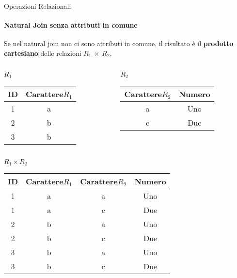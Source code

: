     \begin{frame}{Operazioni Relazionali}
        \framesubtitle{Natural Join senza attributi in comune}
        Se nel natural join non ci sono attributi in comune, il risultato \`e il \textbf{prodotto cartesiano} delle relazioni $R_1~\times~R_2$.
        \begin{columns}
            \begin{column}{0.48\textwidth}
                \centering
                {\small $R_1$}
                \newline
        \begin{tabular}{|c|c|}
            \hline
            \rowcolor{cyan!30}ID & Carattere$R_1$ \\
            \hline
            1 & a \\ \hline
            2 & b \\ \hline
            3 & b \\ \hline
            \end{tabular}
            \end{column}
            \begin{column}{0.48\textwidth}
                \centering
                {\small $R_2$}
                \newline
                \begin{tabular}{|c|c|}
                    \hline
                    \rowcolor{cyan!30} Carattere$R_2$ & Numero \\ \hline
                    a & Uno \\ \hline
                    c & Due \\ \hline
                    \end{tabular}
            \end{column}
        \end{columns}
        \vspace{.1cm}
        \centering
        \pause
        {\small $R_1 \times R_2$
        \begin{tabular}{|c|c|c|c|}
            \hline
            \rowcolor{cyan!30} ID & Carattere$R_1$ & Carattere$R_2$ & Numero \\ \hline
            1 & a & a & Uno \\ \hline
            1 & a & c & Due \\ \hline
            2 & b & a & Uno \\ \hline
            2 & b & c & Due \\ \hline
            3 & b & a & Uno \\ \hline
            3 & b & c & Due \\ \hline
            \end{tabular}}
    \end{frame}

